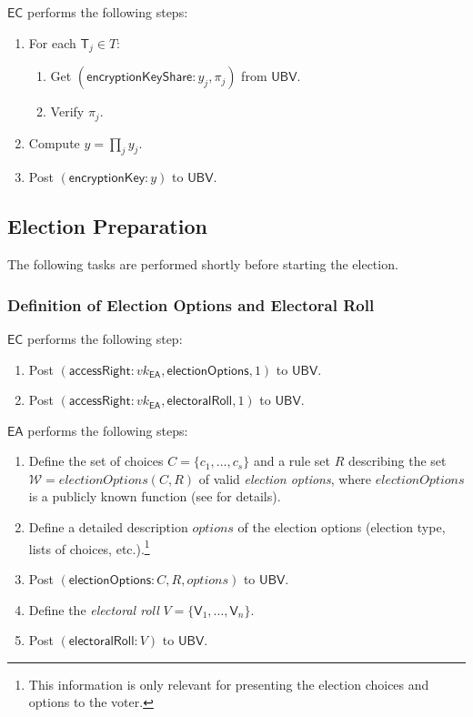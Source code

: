 \documentclass[bibtotoc,halfparskip,oneside]{scrreprt}
\newcommand{\descrOptions}{\mathit{options}\xspace}
\newcommand{\vk}[1]{\mathit{vk}_{#1}\xspace}
\newcommand{\EA}{\ensuremath{\mathsf{EA}}\xspace}
\newcommand{\EC}{\ensuremath{\mathsf{EC}}\xspace}
\newcommand{\UBV}{\ensuremath{\mathsf{UBV}}\xspace}
\newcommand{\Tallier}[1]{\ensuremath{\mathsf{T}_{#1}}\xspace}
\newcommand{\Voter}[1]{\ensuremath{\mathsf{V}_{#1}}\xspace}
\begin{document}
\EC performs the following steps:
\begin{enumerate}[resume]
	\item For each $\Tallier{j}\in T$:
	\begin{enumerate}
		\item Get $(\mathsf{encryptionKeyShare}:y_j,\pi_{j})$ from \UBV.
		\item Verify $\pi_{j}$.
	\end{enumerate}
	\item Compute $y=\prod_j y_j$.
	\item Post $(\mathsf{encryptionKey}:y)$ to \UBV.
\end{enumerate}


\subsection{Election Preparation}\label{preparation}

The following tasks are performed shortly before starting the election.

\subsubsection{Definition of Election Options and Electoral Roll}

\EC performs the following step:
\begin{enumerate}
	\item Post $(\mathsf{accessRight}: \vk{\EA}, \mathsf{electionOptions}, 1)$ to \UBV.
	\item Post $(\mathsf{accessRight}: \vk{\EA}, \mathsf{electoralRoll}, 1)$ to \UBV.
\end{enumerate}

\EA performs the following steps:
\begin{enumerate}[resume]
	\item Define the set of choices $C=\{c_1,\ldots,c_s\}$ and a rule set $R$ describing the set $\mathcal{W}=\mathit{electionOptions}(C,R)$ of valid \emph{election options}, where $\mathit{electionOptions}$ is a publicly known function (see  for details).
	\item Define a detailed description $\descrOptions$ of the election options (election type, lists of choices, etc.).\footnote{This information is only relevant for presenting the election choices and options to the voter.}
	\item Post $(\mathsf{electionOptions}:C,R,\descrOptions)$ to \UBV.
	\item Define the \emph{electoral roll} $V=\{\Voter{1},\ldots,\Voter{n}\}$.
	\item Post $(\mathsf{electoralRoll}:V)$ to \UBV.
\end{enumerate}
\end{document}
